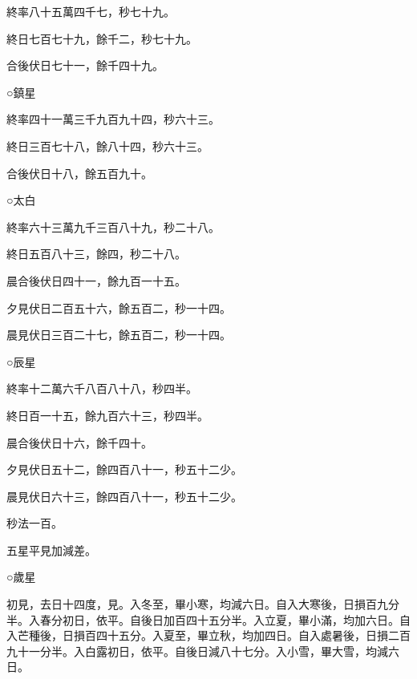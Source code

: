 \begin{pinyinscope}
 終率八十五萬四千七，秒七十九。



 終日七百七十九，餘千二，秒七十九。



 合後伏日七十一，餘千四十九。



 ○鎮星



 終率四十一萬三千九百九十四，秒六十三。



 終日三百七十八，餘八十四，秒六十三。



 合後伏日十八，餘五百九十。



 ○太白



 終率六十三萬九千三百八十九，秒二十八。



 終日五百八十三，餘四，秒二十八。



 晨合後伏日四十一，餘九百一十五。



 夕見伏日二百五十六，餘五百二，秒一十四。



 晨見伏日三百二十七，餘五百二，秒一十四。



 ○辰星



 終率十二萬六千八百八十八，秒四半。



 終日百一十五，餘九百六十三，秒四半。



 晨合後伏日十六，餘千四十。



 夕見伏日五十二，餘四百八十一，秒五十二少。



 晨見伏日六十三，餘四百八十一，秒五十二少。



 秒法一百。



 五星平見加減差。



 ○歲星



 初見，去日十四度，見。入冬至，畢小寒，均減六日。自入大寒後，日損百九分半。入春分初日，依平。自後日加百四十五分半。入立夏，畢小滿，均加六日。自入芒種後，日損百四十五分。入夏至，畢立秋，均加四日。自入處暑後，日損二百九十一分半。入白露初日，依平。自後日減八十七分。入小雪，畢大雪，均減六日。




\end{pinyinscope}
